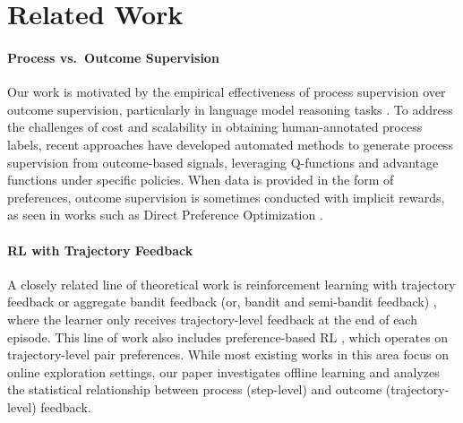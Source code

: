 \section{Related Work}
\label{sec: app-related-work}

\paragraph{Process vs.~Outcome Supervision}
Our work is motivated by the empirical effectiveness of process supervision over outcome supervision, particularly in language model reasoning tasks \citep{cobbe2021training,uesato2022solving,lightman2023let}.
To address the challenges of cost and scalability in obtaining human-annotated process labels, recent approaches \citep{wang2024math,luo2024improve,setlur2024rewarding} have developed automated methods to generate process supervision from outcome-based signals, leveraging Q-functions and advantage functions under specific policies.
When data is provided in the form of preferences, outcome supervision is sometimes conducted with implicit rewards, as seen in works such as Direct Preference Optimization \citep{rafailov2023direct,lambert2024rewardbench,zhong2024dpo,yuan2024free}.


\paragraph{RL with Trajectory Feedback}
A closely related line of theoretical work is reinforcement learning with trajectory feedback or aggregate bandit feedback (or, bandit and semi-bandit feedback) \citep{neu2013efficient,efroni2021reinforcement,chatterji2021theory,chen2022human,cassel2024near,lancewicki2025near}, where the learner only receives trajectory-level feedback at the end of each episode. This line of work also includes preference-based RL \citep{pacchiano2021dueling,zhu2023principled,wu2023making,zhan2023provable}, which operates on trajectory-level pair preferences. While most existing works in this area focus on online exploration settings, our paper investigates offline learning and analyzes the statistical relationship between process (step-level) and outcome (trajectory-level) feedback.



